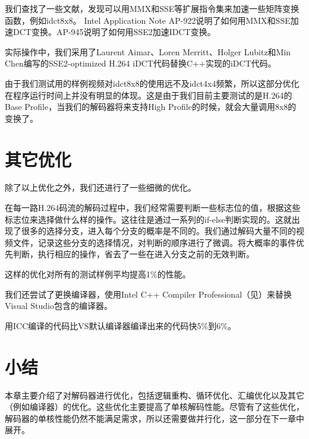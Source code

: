 我们查找了一些文献，发现可以用MMX和SSE等扩展指令集来加速一些矩阵变换函数，例如idct8x8。
Intel Application Note AP-922\cite{intel-ap922}说明了如何用MMX和SSE加速DCT变换。AP-945\cite{intel-ap945}说明了如何用SSE2加速IDCT变换。

实际操作中，我们采用了Laurent Aimar、Loren Merritt、Holger Lubitz和Min Chen编写的SSE2-optimized H.264 iDCT代码替换C++实现的iDCT代码。

由于我们测试用的样例视频对idct8x8的使用远不及idct4x4频繁，所以这部分优化在程序运行时间上并没有明显的体现。这是由于我们目前主要测试的是H.264的Base Profile，当我们的解码器将来支持High Profile的时候，就会大量调用8x8的变换了。

\section{其它优化}
\label{sec:singlecoreothers}

除了以上优化之外，我们还进行了一些细微的优化。

在每一路H.264码流的解码过程中，我们经常需要判断一些标志位的值，根据这些标志位来选择做什么样的操作。这往往是通过一系列的if-else判断实现的。这就出现了很多的选择分支，进入每个分支的概率是不同的。我们通过解码大量不同的视频文件，记录这些分支的选择情况，对判断的顺序进行了微调。将大概率的事件优先判断，执行相应的操作，省去了一些在进入分支之前的无效判断。

这样的优化对所有的测试样例平均提高1\%的性能。

我们还尝试了更换编译器，使用Intel C++ Compiler Professional（见）来替换Visual Studio包含的编译器。

用ICC编译的代码比VS默认编译器编译出来的代码快5\%到6\%。

\section{小结}
\label{sec:sum4}
本章主要介绍了对解码器进行优化，包括逻辑重构、循环优化、汇编优化以及其它（例如编译器）的优化。这些优化主要提高了单核解码性能。尽管有了这些优化，解码器的单核性能仍然不能满足需求，所以还需要做并行化，这一部分在下一章中展开。

\cleardoublepage
